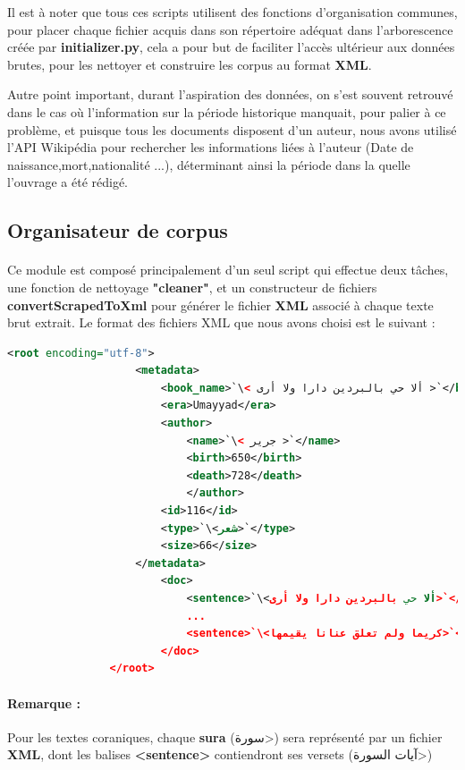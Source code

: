 \documentclass[]{report}
\begin{document}
			\par 
			Il est à noter que tous ces scripts utilisent des fonctions d'organisation communes, pour placer chaque fichier acquis dans son répertoire adéquat dans l'arborescence créée par \textbf{initializer.py}, cela a pour but de faciliter l'accès ultérieur aux données brutes, pour les nettoyer et construire les corpus au format \textbf{XML}.
			\par 
			Autre point important, durant l'aspiration des données, on s'est souvent retrouvé dans le cas où l'information sur la période historique manquait, pour palier à ce problème, et puisque tous les documents disposent d'un auteur, nous avons utilisé l'API Wikipédia pour rechercher les informations liées à l'auteur (Date de naissance,mort,nationalité ...), déterminant ainsi la période dans la quelle l'ouvrage a été rédigé.
			 
		\subsection{Organisateur de corpus}
			\paragraph{}
			Ce module est composé principalement d'un seul script qui effectue deux tâches, une fonction de nettoyage \textbf{"cleaner"}, et un constructeur de fichiers \textbf{convertScrapedToXml} pour générer le fichier \textbf{XML} associé à chaque texte brut extrait.
			Le format des fichiers XML que nous avons choisi est le suivant : 
			
			
			\begin{lstlisting}[language=XML]
			 	<root encoding="utf-8">
				 	<metadata>
					 	<book_name>`\< ألا حي بالبردين دارا ولا أرى >`</book_name>
					 	<era>Umayyad</era>
					 	<author>
						 	<name>`\< جرير >`</name>
						 	<birth>650</birth>
						 	<death>728</death>
						 	</author>
					 	<id>116</id>
					 	<type>`\<شعر>`</type>
					 	<size>66</size>
				 	</metadata>
					 	<doc>
						 	<sentence>`\<ألا حي بالبردين دارا ولا أرى>`</sentence>
						 	...
						 	<sentence>`\<كريما ولم تعلق عنانا يقيمها>`</sentence>
					 	</doc>
			 	</root>
			\end{lstlisting}
			
			\paragraph{Remarque : }
			Pour les textes coraniques, chaque \textbf{sura} (\<سورة>) sera représenté par un fichier \textbf{XML}, dont les balises 	\textbf{<sentence>} contiendront ses versets (\<آيات السورة>)
			
\end{document}
